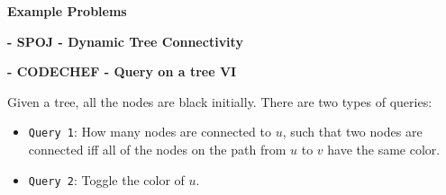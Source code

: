 \textbf{Example Problems}

\begin{problem}
  \textbf{- SPOJ - Dynamic Tree Connectivity} \cite{SPOJ_DYNACON1}
\end{problem}

\begin{problem}
  \textbf{- CODECHEF - Query on a tree VI} \cite{QTREE6}

  Given a tree, all the nodes are black initially. There are two types of queries:
\end{problem}
\begin{itemize}
  \item {\lstinline{Query 1}: How many nodes are connected to $u$, such that two nodes are connected iff all of the nodes on the path from $u$ to $v$ have the same color.}
  \item {\lstinline{Query 2}: Toggle the color of $u$.}
\end{itemize}
